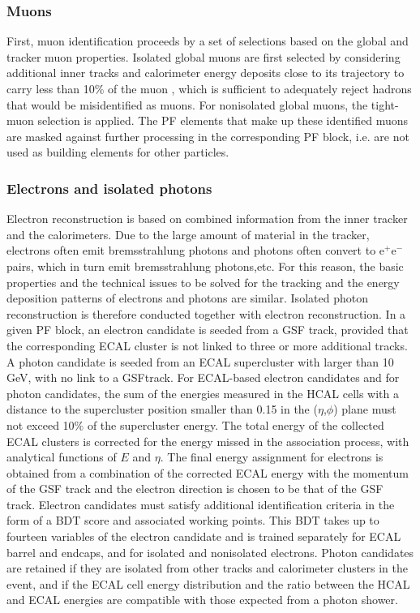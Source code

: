 \subsubsection{Muons} First, muon identification proceeds by a set of selections based on the global and tracker muon properties. Isolated global muons are first selected by considering additional inner tracks and calorimeter energy deposits close to its trajectory to carry less than 10$\%$ of the muon \pt, which is sufficient to adequately reject hadrons that would be misidentified as muons. For nonisolated global muons, the tight-muon selection \cite{collaboration_2012} is applied. The PF elements that make up these identified muons are masked against further processing in the corresponding PF block, i.e. are not used as building elements for other particles.

\subsubsection{Electrons and isolated photons} Electron reconstruction is based on combined information from the inner tracker and the calorimeters. Due to the large amount of material in the tracker, electrons often emit bremsstrahlung photons and photons often convert to e$^+$e$^-$ pairs, which in turn emit bremsstrahlung photons,etc.  For this reason, the basic properties and the technical issues to be solved for the tracking and the energy deposition patterns of electrons and photons are similar. Isolated photon reconstruction is therefore conducted together with electron reconstruction. In a given PF block, an electron candidate is seeded from a GSF track, provided that the corresponding ECAL cluster is not linked to three or more additional tracks. A photon candidate is seeded from an ECAL supercluster with \et larger than 10 GeV, with no link to a GSFtrack. For ECAL-based electron candidates and for photon candidates, the sum of the energies measured in the HCAL cells with a distance to the supercluster position smaller than 0.15 in the ($\eta$,$\phi$) plane must not exceed 10$\%$ of the supercluster energy. The total energy of the collected ECAL clusters is corrected for the energy missed in the association process, with analytical functions of $E$ and $\eta$. The final energy assignment for electrons is obtained from a combination of the corrected ECAL energy with the momentum of the GSF track and the electron direction is chosen to be that of the GSF track. Electron candidates must satisfy additional identification criteria in the form of a BDT score and associated working points. This BDT takes up to fourteen variables of the electron candidate and is trained separately for ECAL barrel and endcaps, and for isolated and nonisolated electrons. Photon candidates are retained if they are isolated from other tracks and calorimeter clusters in the event, and if the ECAL cell energy distribution and the ratio between the HCAL and ECAL energies are compatible with those expected from a photon shower. 

